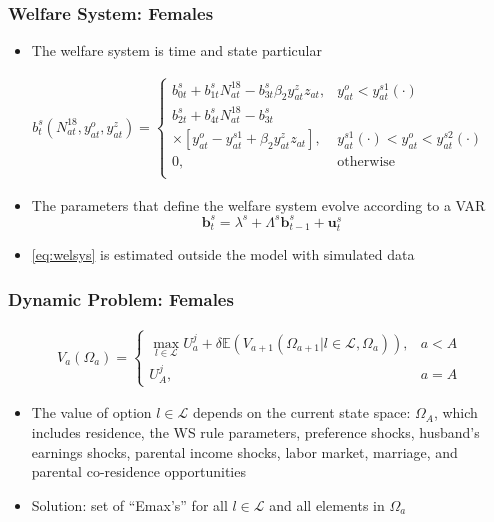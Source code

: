 \begin{frame}
	\frametitle{Welfare System: Females}
	\begin{itemize}
		\item The welfare system is time and state particular
	\end{itemize}
	\begin{eqnarray}
b_{t}^s \left( N_{at}^{18}, y_{at}^o, y_{at}^z \right) =
\begin{cases}
b_{0t}^s + b_{1t}^s N_{at}^{18} - b_{3t}^s \beta_{2} y_{at}^z z_{at}, & y_{at}^o < y_{at}^{s1}(\cdot) \nonumber \\
b_{2t}^s + b_{4t}^s N_{at}^{18} - b_{3t}^s & \nonumber \\
\times \left[ y_{at}^o - y_{at}^{s1} + \beta_{2} y_{at}^z z_{at} \right] , & y_{at}^{s1}(\cdot) < y_{at}^o < y_{at}^{s2}(\cdot) \nonumber \\
0, & \text{otherwise} \nonumber \\
\end{cases}
	\end{eqnarray}
	\begin{itemize}
	\item The parameters that define the welfare system evolve according to a VAR
		\begin{equation}
		\mathbf{b}_{t}^s = \lambda^s + \Lambda^s \mathbf{b}_{t-1}^s + \mathbf{u}_{t}^s \label{eq:welsys}
		\end{equation}
	 \item \eqref{eq:welsys} is estimated outside the model with simulated data
	\end{itemize}
\end{frame}


\begin{frame}
	\frametitle{Dynamic Problem: Females}
	\begin{eqnarray}
		V_{a} (\Omega_{a}) = 
		\begin{cases}	
			\max_{l \in \mathcal{L}} {U_{a}^j + \delta \mathbb{E} \left(  V_{a+1}(\Omega_{a+1} | l \in \mathcal{L}, \Omega_{a}) \right) }, & a < A \nonumber \\
			U_{A}^j, & a = A \nonumber
		\end{cases}  
	\end{eqnarray}
	\begin{itemize}
		\item The value of option $l \in \mathcal{L}$ depends on the current state space: $\Omega_{A}$, which includes residence, the WS rule parameters, preference shocks, husband's earnings shocks, parental income shocks, labor market, marriage, and parental co-residence opportunities
		\item Solution: set of ``Emax's'' for all $l \in \mathcal{L}$ and all elements in $\Omega_{a}$ 
	\end{itemize}
\end{frame}

